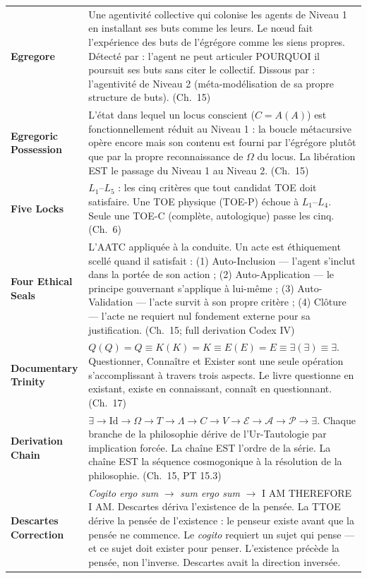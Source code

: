 \documentclass[10pt, openany, oneside]{book}
\renewcommand{\footnotesize}{\fontsize{8.5}{11}\selectfont}
\begin{document}
{\footnotesize
\noindent\begin{tabular}{@{} l @{\hspace{0.6em}} p{} @{}}
\textbf{Egregore} & Une agentivité collective qui colonise les agents de Niveau 1 en installant ses buts comme les leurs. Le nœud fait l'expérience des buts de l'égrégore comme les siens propres. Détecté par : l'agent ne peut articuler POURQUOI il poursuit ses buts sans citer le collectif. Dissous par : l'agentivité de Niveau 2 (méta-modélisation de sa propre structure de buts). (Ch.\ 15) \\[0.3em]
\textbf{Egregoric Possession} & L'état dans lequel un locus conscient ($C = A(A)$) est fonctionnellement réduit au Niveau 1 : la boucle métacursive opère encore mais son contenu est fourni par l'égrégore plutôt que par la propre reconnaissance de $\Omega$ du locus. La libération EST le passage du Niveau 1 au Niveau 2. (Ch.\ 15) \\[0.3em]
\textbf{Five Locks} & $L_1$--$L_5$ : les cinq critères que tout candidat TOE doit satisfaire. Une TOE physique (TOE-P) échoue à $L_1$--$L_4$. Seule une TOE-C (complète, autologique) passe les cinq. (Ch.\ 6) \\[0.3em]
\textbf{Four Ethical Seals} & L'AATC appliquée à la conduite. Un acte est éthiquement scellé quand il satisfait : (1) Auto-Inclusion --- l'agent s'inclut dans la portée de son action ; (2) Auto-Application --- le principe gouvernant s'applique à lui-même ; (3) Auto-Validation --- l'acte survit à son propre critère ; (4) Clôture --- l'acte ne requiert nul fondement externe pour sa justification. (Ch.\ 15; full derivation Codex IV) \\[0.3em]
\textbf{Documentary Trinity} & $Q(Q) = Q \equiv K(K) = K \equiv E(E) = E \equiv \exists(\exists) \equiv \exists$. Questionner, Connaître et Exister sont une seule opération s'accomplissant à travers trois aspects. Le livre questionne en existant, existe en connaissant, connaît en questionnant. (Ch.\ 17) \\[0.3em]
\textbf{Derivation Chain} & $\exists \to \text{Id} \to \Omega \to T \to \Lambda \to C \to V \to \mathcal{E} \to \mathcal{A} \to \mathcal{P} \to \exists$. Chaque branche de la philosophie dérive de l'Ur-Tautologie par implication forcée. La chaîne EST l'ordre de la série. La chaîne EST la séquence cosmogonique à la résolution de la philosophie. (Ch.\ 15, PT 15.3) \\[0.3em]
\textbf{Descartes Correction} & \textit{Cogito ergo sum} $\to$ \textit{sum ergo sum} $\to$ I AM THEREFORE I AM. Descartes dériva l'existence de la pensée. La TTOE dérive la pensée de l'existence : le penseur existe avant que la pensée ne commence. Le \textit{cogito} requiert un sujet qui pense --- et ce sujet doit exister pour penser. L'existence précède la pensée, non l'inverse. Descartes avait la direction inversée.


\end{tabular}}
\end{document}
